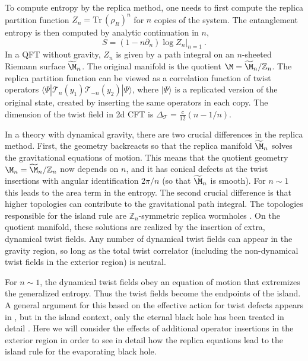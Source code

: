 \documentclass[11pt,oneside,letterpaper]{article}
\newcommand{\p}{\partial}
\newcommand{\be}{\begin{equation}}
\newcommand{\ee}{\end{equation}}
\def\be{\begin{eqnarray}}
\def\ee{\end{eqnarray}}
\newcommand{\tr}{\textrm{Tr}\,}
\def\be{\begin{equation}}
\def\ee{\end{equation}}
\renewcommand{\p}{\partial}
\numberwithin{equation}{section}
\def\p{{\phi}}
\def\be{\begin{equation}}
\def\ee{\end{equation}}
\def \be {\begin{equation}}
\def \ee {\end{equation}}
\renewcommand{\p}{\partial}
\begin{document}
\begin{spacing}{1.1}
To compute entropy by the replica method, one needs to first compute the replica partition function $Z_n = \tr (\rho_R)^n$ for $n$ copies of the system. The entanglement entropy is then computed by analytic continuation in $n$,
\be
S = (1- n \p_n) \log \left. Z_n \right|_{n=1} \ .
\ee
In a QFT without gravity, $Z_n$ is given by a path integral on an $n$-sheeted Riemann surface $\widetilde{\M}_n$. The original manifold is the quotient $\M = \widetilde{\M}_n/\mathbb{Z}_n$. The replica partition function can be viewed as a correlation function of twist operators $\langle \Psi| \mathcal{T}_n(y_1) \mathcal{T}_{-n}(y_2)   |\Psi \rangle$, where $|\Psi\rangle$ is a replicated version of the original state, created by inserting the same operators in each copy.  The dimension of the twist field in 2d CFT is $\Delta_{\mathcal{T}} = \frac{c}{12}(n - 1/n)$.

In a theory with dynamical gravity, there are two crucial differences in the replica method. First, the geometry backreacts so that the replica manifold $\widetilde{\M}_n$ solves the gravitational equations of motion. This means that the quotient geometry $\M_n = \widetilde{\M}_n/\mathbb{Z}_n$ now depends on $n$, and it has conical defects at the twist insertions with angular identification $2\pi/n$ (so that $\widetilde{\M}_n$ is smooth). For $n \sim 1$ this leads to the area term in the entropy. The second crucial difference is that higher topologies can contribute to the gravitational path integral. The topologies responsible for the island rule are $\mathbb{Z}_n$-symmetric replica wormholes \cite{Almheiri:2019qdq,Penington:2019kki}. On the quotient manifold, these solutions are realized by the insertion of extra, dynamical twist fields. Any number of dynamical twist fields can appear in the gravity region, so long as the total twist correlator (including the non-dynamical twist fields in the exterior region) is neutral. 

For $n\sim 1$, the dynamical twist fields obey an equation of motion that extremizes the generalized entropy. Thus the twist fields become the endpoints of the island. A general argument for this based on the effective action for twist defects appears in \cite{Lewkowycz:2013nqa, Dong:2017xht,Almheiri:2019qdq, Penington:2019kki}, but in the island context, only the eternal black hole has been treated in detail \cite{Almheiri:2019qdq, Penington:2019kki}. Here we will consider the effects of additional operator insertions in the exterior region in order to see in detail how the replica equations lead to the island rule for the evaporating black hole.


\end{spacing}
\end{document}
